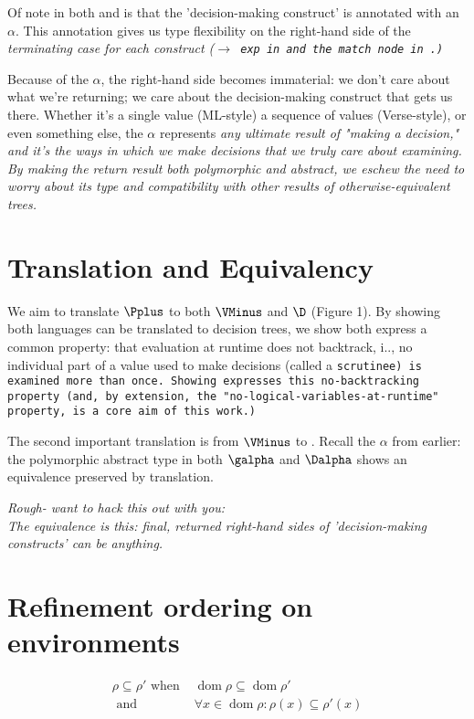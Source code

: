 \documentclass[]{article}
\DeclareMathOperator{\dom}{dom}
\begin{document}
Of note in both \VMinus and \D is that the 'decision-making construct' is 
annotated with an $\alpha$. This annotation gives us type flexibility on the 
right-hand side of the \it{terminating} case for each construct 
(\tt{$\rightarrow$ exp} in \VMinus and the match node in \D.) 

Because of the $\alpha$, the right-hand side becomes immaterial: we don't care
about what we're returning; we care about the decision-making construct that
gets us there. Whether it's a single value (ML-style) a sequence of values
(Verse-style), or even something else, the $\alpha$ represents \it{any} ultimate
result of "making a decision," and it's the ways in which we make decisions that
we truly care about examining. By making the return result both polymorphic and
abstract, we eschew the need to worry about its type and compatibility with
other results of otherwise-equivalent trees. 

\section{Translation and Equivalency}

We aim to translate $\Pplus$ to both $\VMinus$ and $\D$ (Figure 1). By showing both
languages can be translated to decision trees, we show both express a common
property: that evaluation at runtime does not backtrack, i.\expr., no individual
part of a value used to make decisions (called a \tt{scrutinee}) is examined
more than once. Showing \VMinus expresses this no-backtracking property (and, by
extension, the "no-logical-variables-at-runtime" property, is a core aim of this
work.)

The second important translation is from $\VMinus$ to \D. Recall the $\alpha$ from
earlier: the polymorphic abstract type in both $\galpha$ and $\Dalpha$ shows
an equivalence preserved by translation. 

\it{Rough- want to hack this out with you:} \\
The equivalence is this: final, returned right-hand sides of 'decision-making 
constructs' can be anything. 


        
\section{Refinement ordering on environments}

\begin{align*}
\rho \subseteq \rho' \text{ when }&\dom\rho  \subseteq \dom \rho'\\
\text{ and } &\forall x \in \dom \rho: \rho(x) \subseteq \rho'(x)
\end{align*}
\end{document}
